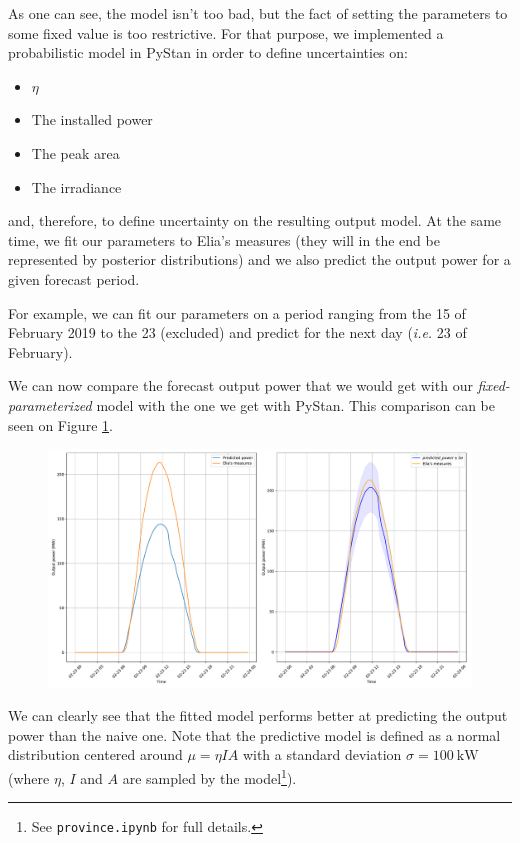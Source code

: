 \documentclass[a4paper, 12pt]{article}
\begin{document}
	As one can see, the model isn't too bad, but the fact of setting the parameters to some fixed value is too restrictive. For that purpose, we implemented a probabilistic model in PyStan in order to define uncertainties on:

	\begin{itemize}
	    \item $\eta$
	    \item The installed power
	    \item The peak area
	    \item The irradiance
	\end{itemize}

    and, therefore, to define uncertainty on the resulting output model. At the same time, we fit our parameters to Elia's measures (they will in the end be represented by posterior distributions) and we also predict the output power for a given forecast period.
    
    For example, we can fit our parameters on a period ranging from the 15 of February 2019 to the 23 (excluded) and predict for the next day (\emph{i.e.} 23 of February).
	
	We can now compare the forecast output power that we would get with our \emph{fixed-parameterized} model with the one we get with PyStan. This comparison can be seen on Figure \ref{fig:comparison_naive_post}.
	
	\begin{figure}[H]
	    \centering
	    \includegraphics[width=\textwidth]{resources/pdf/comparison_naive_post.pdf}
	    \label{fig:comparison_naive_post}
	\end{figure}

	We can clearly see that the fitted model performs better at predicting the output power than the naive one. Note that the predictive model is defined as a normal distribution centered around
	$\mu = \eta I A$ with a standard deviation $\sigma = \SI{100}{\kilo\watt}$ (where $\eta$, $I$ and $A$ are sampled by the model\footnote{See \texttt{province.ipynb} for full details.}).  
	
\end{document}
